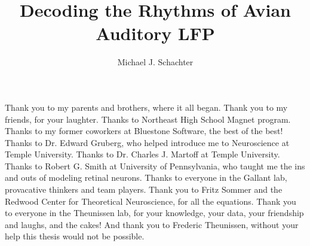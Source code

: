 \documentclass{ucbthesis}
\begin{document}

\title{Decoding the Rhythms of Avian Auditory LFP}
\author{Michael J. Schachter}


\maketitle
\approvalpage
\copyrightpage



\begin{frontmatter}

\begin{acknowledgements}

\begin{center}
Thank you to my parents and brothers, where it all began. Thank you to my friends, for your laughter. Thanks to Northeast High School Magnet program. Thanks to my former coworkers at Bluestone Software, the best of the best! Thanks to Dr. Edward Gruberg, who helped introduce me to Neuroscience at Temple University. Thanks to Dr. Charles J. Martoff at Temple University. Thanks to Robert G. Smith at University of Pennsylvania, who taught me the ins and outs of modeling retinal neurons. Thanks to everyone in the Gallant lab, provacative thinkers and team players. Thank you to Fritz Sommer and the Redwood Center for Theoretical Neuroscience, for all the equations. Thank you to everyone in the Theunissen lab, for your knowledge, your data, your friendship and laughs, and the cakes! And thank you to Frederic Theunissen, without your help this thesis would not be possible.
\end{center}

\end{acknowledgements}


\tableofcontents
\clearpage
\listoffigures
\clearpage
\listoftables

\end{frontmatter}

\pagestyle{headings}






\printbibliography
\end{document}
